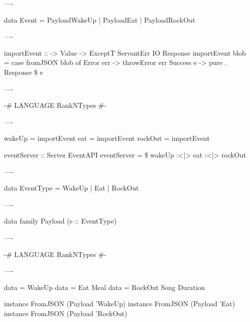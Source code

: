 ----

\begin{raw}
  data Event = PayloadWakeUp  
             | PayloadEat     
             | PayloadRockOut 

\end{raw}

----

\begin{raw}
  importEvent :: 
              -> Value
              -> ExceptT ServantErr IO Response
  importEvent  blob =
    case fromJSON blob of
      Error   err -> throwError err
      Success e   -> pure . Response \$  e
\end{raw}

----

\begin{raw}
  {-# LANGUAGE RankNTypes #-}
\end{raw}

----

\begin{raw}
  wakeUp  = importEvent 
  eat     = importEvent 
  rockOut = importEvent 

  eventServer :: Server EventAPI
  eventServer =  \$
    wakeUp :<|> eat :<|> rockOut
\end{raw}

----

\begin{hs}
  data EventType = WakeUp | Eat | RockOut
\end{hs}

----

\begin{hs}
  data family Payload (e :: EventType)
\end{hs}

----

\begin{raw}
  {-# LANGUAGE RankNTypes   #-}
\end{raw}

----

\begin{raw}
  data   = WakeUp
  data      = Eat Meal
  data  = RockOut Song Duration

  instance FromJSON (Payload 'WakeUp)
  instance FromJSON (Payload 'Eat)
  instance FromJSON (Payload 'RockOut)
\end{raw}

